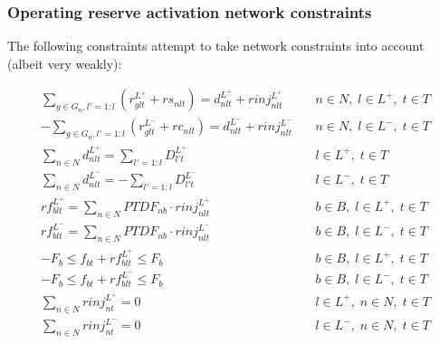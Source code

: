 \documentclass[number,times]{elsarticle}
\begin{document}
\subsubsection{Operating reserve activation network constraints} \label{sec:operating_reserve_network_activation_constraints}

The following constraints attempt to take network constraints into account (albeit very weakly):

\begin{align}
    \sum_{g \in G_n, l'=1:l} (r^{L^+}_{glt} + rs_{nlt}) = d^{L^+}_{nlt} + rinj^{L^+}_{nlt}   & \quad n \in N, \; l \in L^+, \; t \in T \label{eq:reserve_network_activation_constraints_1} \\
    - \sum_{g \in G_n, l'=1:l} (r^{L^-}_{glt} + rc_{nlt}) = d^{L^-}_{nlt} + rinj^{L^-}_{nlt} & \quad n \in N, \; l \in L^-, \; t \in T                                                     \\
    \sum_{n \in N} d^{L^+}_{nlt} = \sum_{l'=1:l} D^{L^+}_{l't}                               & \quad l \in L^+, \; t \in T                                                                 \\
    \sum_{n \in N} d^{L^-}_{nlt} = - \sum_{l'=1:l} D^{L^-}_{l't}                             & \quad l \in L^-, \; t \in T                                                                 \\
    rf^{L^+}_{blt} = \sum_{n \in N} PTDF_{nb} \cdot rinj^{L^+}_{nlt}                         & \quad b \in B, \; l \in L^+, \; t \in T                                                     \\
    rf^{L^-}_{blt} = \sum_{n \in N} PTDF_{nb} \cdot rinj^{L^-}_{nlt}                         & \quad b \in B, \; l \in L^-, \; t \in T                                                     \\
    -F_{b} \leq f_{bt} + rf^{L^+}_{blt} \leq F_b                                             & \quad b \in B, \; l \in L^+, \; t \in T                                                     \\
    -F_{b} \leq f_{bt} + rf^{L^-}_{blt} \leq F_b                                             & \quad b \in B, \; l \in L^-, \; t \in T                                                     \\
    \sum_{n \in N} rinj^{L^+}_{nt} = 0                                                       & \quad l \in L^+, \; n \in N, \; t \in T                                                     \\
    \sum_{n \in N} rinj^{L^-}_{nt} = 0                                                       & \quad l \in L^-, \; n \in N, \; t \in T \label{eq:reserve_network_activation_constraints_2}
\end{align}
\end{document}
